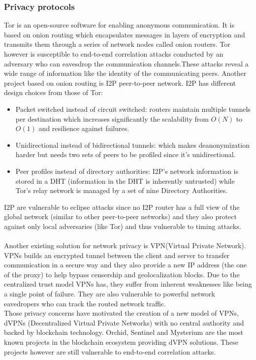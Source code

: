 \subsubsection{Privacy protocols}
Tor is an open-source software for enabling anonymous communication. It is based on onion routing which encapsulates messages in layers of encryption and transmits them through a series of network nodes called onion routers. Tor however is susceptible to end-to-end correlation attacks conducted by an adversary who can eavesdrop the communication channels.These attacks reveal a wide range of information like the identity of the communicating peers.
Another project based on onion routing is I2P peer-to-peer network. I2P has different design choices from those of Tor:
\begin{itemize}
    \item Packet switched instead of circuit switched: routers maintain multiple tunnels per destination which increases significantly the scalability from $O(N)$ to $O(1)$ and resilience against failures.
    \item Unidirectional instead of bidirectional tunnels: which makes deanonymization harder but needs two sets of peers to be profiled since it's unidirectional.
    \item Peer profiles instead of directory authorities: I2P’s network information is stored in a DHT (information in the DHT is inherently untrusted) while Tor’s relay network is managed by a set of nine Directory Authorities.

\end{itemize}
I2P are vulnerable to eclipse attacks since no I2P router has a full view of the global network (similar to other peer-to-peer networks) and they also protect against only local adversaries (like Tor) and thus vulnerable to timing attacks.
\\~\\Another existing solution for network privacy is VPN(Virtual Private Network). 
VPNs builds an encrypted tunnel between the client and server to transfer communication in a secure way and they also provide a new IP address (the one of the proxy) to help bypass censership and geolocalization blocks.
Due to the centralized trust model VPNs has, they suffer from inherent weaknesses like being a single point of failure. They are also vulnerable to powerful network eavedropers who can track the routed network traffic.
\\Those privacy concerns have motivated the creation of a new model of VPNs, dVPNs (Decentralized Virtual Private Networks) with no central authority and backed by blockchain technology. Orchid, Sentinel and Mysterium are the most known projects in the blockchain ecosystem providing dVPN solutions. These projects however are still vulnerable to end-to-end correlation attacks. 
